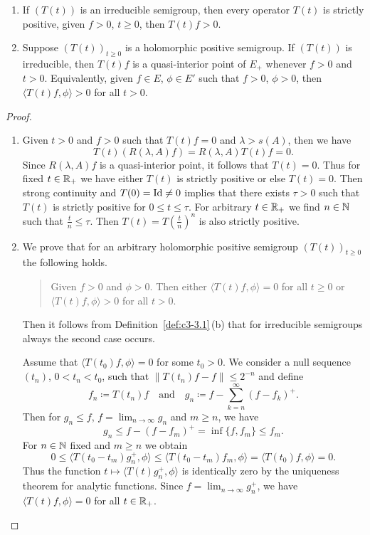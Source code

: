\begin{theorem}\label{thm:c3-3.2}
	\begin{enumerate}[\upshape (i), wide, labelindent=.25em]
	\item
 	If\/ $(T(t))$ is an irreducible semigroup, 
    then every operator $T(t)$ is strictly positive, \ie 
	given $f > 0$, $t \geq 0$, then $T(t)f > 0$.
	\item 
	Suppose $(T(t))_{t\geq 0}$ is a holomorphic positive semigroup.%
	If\/ $(T(t))$ is irreducible, then $T(t)f$ is a quasi-interior point%
    of\/ $E_{+}$ whenever $f > 0$ and $t > 0$.
	Equivalently, given $f \in E$, $\phi \in E'$ such that $f > 0$, $\phi > 0$, then $\langle T(t)f,\phi \rangle > 0$ for all $t > 0$. 
	\end{enumerate}
\end{theorem}
\begin{proof}
\begin{enumerate}[\upshape (i), wide, labelindent=.25em]
	\item
	Given $t > 0$ and $f > 0$ such that $T(t)f = 0$ and $\lambda > s(A)$, then we have 
\[
	T(t)(R(\lambda,A)f) = R(\lambda,A)T(t)f = 0 .
\]
%
Since $R(\lambda,A)f$ is a quasi-interior point, it follows that $T(t) = 0$.
Thus for fixed $t \in \mathbb{R} _{+}$ we have either $T(t)$ is strictly positive or else $T(t) = 0$.
Then strong continuity and $T(0) = \operatorname{Id} \neq 0$ implies that there exists $\tau > 0$ such that $T(t)$ is strictly positive for $0 \leq t \leq \tau$.
For arbitrary $t \in \mathbb{R} _{+}$ we find $n \in \mathbb{N}$ such that $\frac{t}{n} \leq \tau$.
Then $T(t) = T(\frac{t}{n})^{n}$ is also strictly positive.
	
\item
We prove that for an arbitrary holomorphic positive semigroup $(T(t))_{t\geq 0}$ the following holds.
\begin{quote}
Given $f > 0$ and $\phi > 0$.
Then either $\langle T(t)f,\phi \rangle = 0$ for all $t \geq 0$ or $\langle T(t)f,\phi \rangle > 0$ for all $t > 0$.
\end{quote}
Then it follows from Definition~\ref{def:c3-3.1}\,(b) that for irreducible semigroups always the second case occurs.

Assume that $\langle T(t_{0})f,\phi \rangle = 0$ for some $t_{0} > 0$.
We consider a null sequence $(t_{n})$, $0 < t_{n} < t_{0}$, such that $\|T(t_{n})f - f\| \leq 2^{-n}$ and define %
\[
	f_{n} \coloneq T(t_{n})f 
	\quad \text{and} \quad 
	g_{n} \coloneq f - \sum_{k=n}^{\infty}(f-f_{k})^{+}.
\]
%
Then for $g_{n} \leq f$, $f = \lim_{n\to\infty}g_{n}$ and $m \geq n$, we have 
\[
	g_{n} \leq f - (f-f_{m})^{+} = \inf\{f,f_{m}\} \leq f_{m} .
\]
%
For $n \in \mathbb{N}$ fixed and $m \geq n$ we obtain 
%
\[
		0 \leq \langle T(t_{0}-t_{m})g_{n}^{+},\phi \rangle \leq \langle T(t_{0}-t_{m})f_{m},\phi \rangle = \langle T(t_{0})f,\phi \rangle = 0 .
\]
%
Thus the function $t \mapsto \langle T(t)g_{n}^{+},\phi \rangle$ is identically zero by the uniqueness theorem for analytic functions.
Since $f = \lim_{n\to\infty}g_{n}^{+}$, we have $\langle T(t)f,\phi \rangle = 0$ for all $t \in \mathbb{R} _{+}$.
\qedhere
\end{enumerate}
\end{proof}

